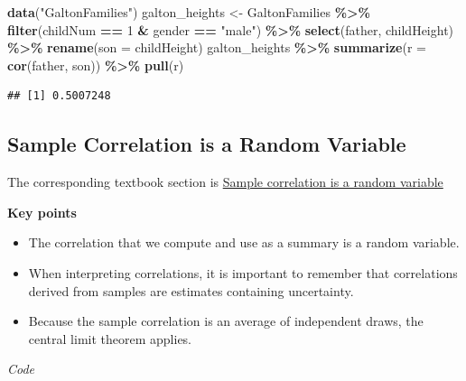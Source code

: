 \documentclass[
]{article}
\newenvironment{Shaded}{\begin{snugshade}}{\end{snugshade}}
\newcommand{\DataTypeTok}[1]{\textcolor[rgb]{0.13,0.29,0.53}{#1}}
\newcommand{\DecValTok}[1]{\textcolor[rgb]{0.00,0.00,0.81}{#1}}
\newcommand{\KeywordTok}[1]{\textcolor[rgb]{0.13,0.29,0.53}{\textbf{#1}}}
\newcommand{\NormalTok}[1]{#1}
\newcommand{\OperatorTok}[1]{\textcolor[rgb]{0.81,0.36,0.00}{\textbf{#1}}}
\newcommand{\StringTok}[1]{\textcolor[rgb]{0.31,0.60,0.02}{#1}}
\providecommand{\tightlist}{%
  \setlength{\itemsep}{0pt}\setlength{\parskip}{0pt}}
\begin{document}
\begin{Shaded}
\begin{Highlighting}[]
\KeywordTok{data}\NormalTok{(}\StringTok{"GaltonFamilies"}\NormalTok{)}
\NormalTok{galton\_heights \textless{}{-}}\StringTok{ }\NormalTok{GaltonFamilies }\OperatorTok{\%\textgreater{}\%}\StringTok{ }\KeywordTok{filter}\NormalTok{(childNum }\OperatorTok{==}\StringTok{ }\DecValTok{1} \OperatorTok{\&}\StringTok{ }\NormalTok{gender }\OperatorTok{==}\StringTok{ "male"}\NormalTok{) }\OperatorTok{\%\textgreater{}\%}\StringTok{ }\KeywordTok{select}\NormalTok{(father, childHeight) }\OperatorTok{\%\textgreater{}\%}\StringTok{ }\KeywordTok{rename}\NormalTok{(}\DataTypeTok{son =}\NormalTok{ childHeight)}
\NormalTok{galton\_heights }\OperatorTok{\%\textgreater{}\%}\StringTok{ }\KeywordTok{summarize}\NormalTok{(}\DataTypeTok{r =} \KeywordTok{cor}\NormalTok{(father, son)) }\OperatorTok{\%\textgreater{}\%}\StringTok{ }\KeywordTok{pull}\NormalTok{(r)}
\end{Highlighting}
\end{Shaded}

\begin{verbatim}
## [1] 0.5007248
\end{verbatim}

\hypertarget{sample-correlation-is-a-random-variable}{%
\subsection{Sample Correlation is a Random
Variable}\label{sample-correlation-is-a-random-variable}}

The corresponding textbook section is
\href{https://rafalab.github.io/dsbook/regression.html\#sample-correlation-is-a-random-variable}{Sample
correlation is a random variable}

\textbf{Key points}

\begin{itemize}
\tightlist
\item
  The correlation that we compute and use as a summary is a random
  variable.
\item
  When interpreting correlations, it is important to remember that
  correlations derived from samples are estimates containing
  uncertainty.
\item
  Because the sample correlation is an average of independent draws, the
  central limit theorem applies.
\end{itemize}

\emph{Code}
\end{document}
